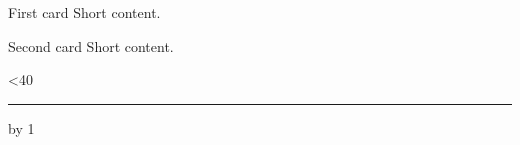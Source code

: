 \documentclass{pnpcards}
\newcommand{\TooMuchContent}{%
    \PageLimitLine=0
    \loop\ifnum\PageLimitLine<40
        \rule{1pt}{6mm}\par
        \advance\PageLimitLine by 1
    \repeat
}
\begin{document}
\begin{card}{First card}
Short content.
\end{card}

\begin{card}{Second card}
Short content.
\end{card}

\begin{card}{}
\TooMuchContent
\end{card}
\end{document}
